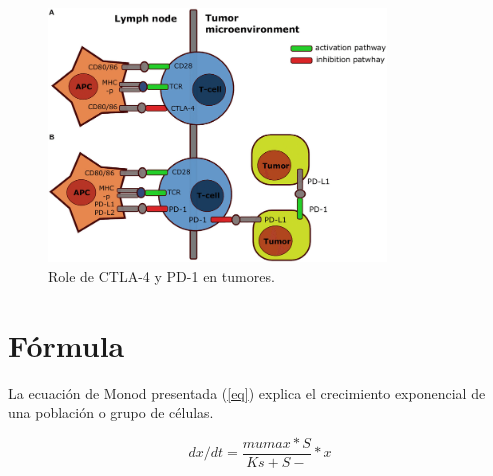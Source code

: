 \documentclass[]{article}
\begin{document}
\begin{figure}[!h]
	\centering
	\includegraphics[width=0.8\textwidth]{images/PD1.png}
	\caption{ Role de CTLA-4 y PD-1 en tumores. } \label{fi2}
\end{figure}



\section{Fórmula}
La ecuación de Monod presentada (\ref{eq}) explica el crecimiento exponencial de una población o grupo de células.

\begin{equation} \label{eq}
dx/dt=\frac{mumax*S}{Ks+S-}*x
\end{equation}



\end{document}
